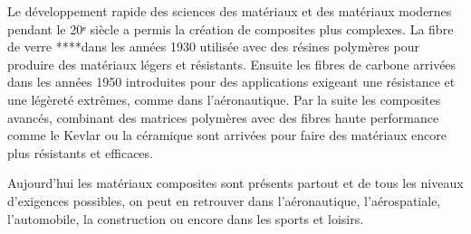 Le développement rapide des sciences des matériaux et des matériaux modernes pendant le 20ᵉ siècle a permis la création de composites plus complexes.
La fibre de verre ****dans les années 1930 utilisée avec des résines polymères pour produire des matériaux légers et résistants.
Ensuite les fibres de carbone arrivées dans les années 1950 introduites pour des applications exigeant une résistance et une légèreté extrêmes, comme dans l’aéronautique.
Par la suite les composites avancés, combinant des matrices polymères avec des fibres haute performance comme le Kevlar ou la céramique sont arrivées pour faire des matériaux encore plus résistants et efficaces.


Aujourd’hui les matériaux composites sont présents partout et de tous les niveaux d’exigences possibles, on peut en retrouver dans l’aéronautique, l’aérospatiale, l’automobile, la construction ou encore dans les sports et loisirs.



